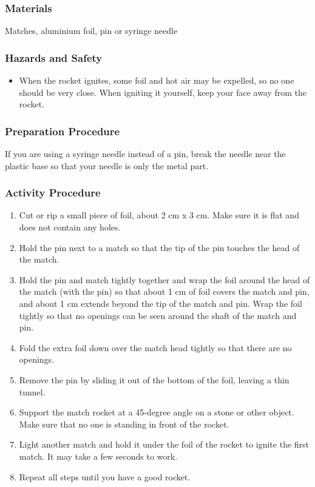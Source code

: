 \subsubsection*{Materials}
Matches, aluminium foil, pin or syringe needle

\subsubsection*{Hazards and Safety}
\begin{itemize}
\item{When the rocket ignites, some foil and hot air may be expelled, so no one should be very close. When igniting it yourself, keep your face away from the rocket.} 
\end{itemize}

\subsubsection*{Preparation Procedure}
If you are using a syringe needle instead of a pin, break the needle near the plastic base so that your needle is only the metal part.

\subsubsection*{Activity Procedure}
\begin{enumerate}
\item{Cut or rip a small piece of foil, about 2 cm x 3 cm. Make sure it is flat and does not contain any holes.} 
\item{Hold the pin next to a match so that the tip of the pin touches the head of the match.} 
\item{Hold the pin and match tightly together and wrap the foil around the head of the match (with the pin) so that about 1 cm of foil covers the match and pin, and about 1 cm extends beyond the tip of the match and pin. Wrap the foil tightly so that no openings can be seen around the shaft of the match and pin.} 
\item{Fold the extra foil down over the match head tightly so that there are no openings.} 
\item{Remove the pin by sliding it out of the bottom of the foil, leaving a thin tunnel.} 
\item{Support the match rocket at a 45-degree angle on a stone or other object. Make sure that no one is standing in front of the rocket.} 
\item{Light another match and hold it under the foil of the rocket to ignite the first match. It may take a few seconds to work.} 
\item{Repeat all steps until you have a good rocket.} 
\end{enumerate}

